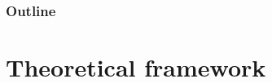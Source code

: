 \documentclass[compress,12pt]{beamer}
\begin{document}

\begin{frame}
\frametitle{Outline}
\tableofcontents
\end{frame}




\section{Theoretical framework}%
\end{document}
